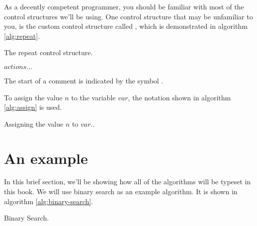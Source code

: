 As a decently competent programmer, you should be familiar with most
of the control structures we'll be using. One control structure that
may be unfamiliar to you, is the custom control structure called
\algorithmicrepeat, which is demonstrated in algorithm
\ref{alg:repeat}.


\begin{algorithm}[H]
  \caption{The repeat control structure.}
  \label{alg:repeat}
  \begin{algorithmic}[1]
      \State $actions\ldots$ 
    \EndRepeatn
  \end{algorithmic}
\end{algorithm}

The start of a comment is indicated by the symbol \commentsymbol.

To assign the value $n$ to the variable $var$, the notation shown in
algorithm \ref{alg:assign} is used.

\begin{algorithm}[H]
  \caption{Assigning the value $n$ to $var$..}
  \label{alg:assign}
  \begin{algorithmic}[1]
  \end{algorithmic}
\end{algorithm}

\section{An example}

In this brief section, we'll be showing how all of the algorithms will
be typeset in this book. We will use binary search as an example
algorithm. It is shown in algorithm \ref{alg:binary-search}.

\begin{algorithm}[H]
  \caption{Binary Search.}
  \label{alg:binary-search}
  \begin{algorithmic}[1]
      \Repeat
        \Else
        \EndIf
    \EndFunction
  \end{algorithmic}
\end{algorithm}